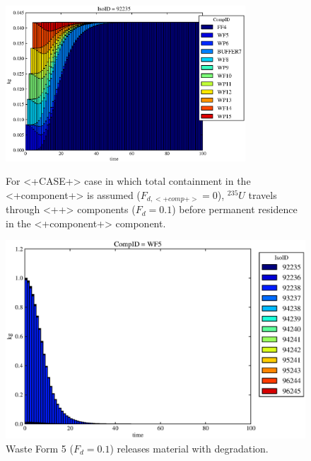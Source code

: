 \begin{figure}[ht]
\centering
\includegraphics[width=0.8\textwidth]{./chapters/demonstration/base/mcIII.eps}
\caption[$^{235}U$ residence. Mixed Cell Coupled Sorption and Solubility Limitation.]{
For <+CASE+> case in which total containment in the <+component+> is assumed 
($F_{d,<+comp+>}=0$), $^{235}U$ travels through <++> components ($F_d = 0.1$) before 
permanent residence in the <+component+> component.
}
\label{fig:mcIIIall}
\begin{minipage}[b]{0.45\linewidth}

  \includegraphics[width=\textwidth]{./chapters/demonstration/base/mcIII1.eps}
  \caption[MCI Waste Form Contaminants.]{
    Waste Form 5 ($F_d = 0.1$) releases material with degradation. 
    }
  \label{fig:mcIIIwf5}
  

\end{minipage}
\end{figure}
